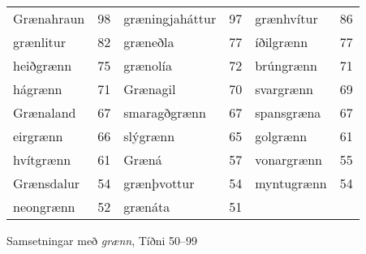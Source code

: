 \documentclass[../samsetningasafn.tex]{subfiles}
\begin{document}
\begin{wordlist}[H]
\begin{tcolorbox}

	\setlength{\extrarowheight}{3pt}
	\begin{tabular}{BlBlBl}		
		Grænahraun		& 98		& 
		græningjaháttur	& 97		& 
		grænhvítur		& 86		\\  
		grænlitur			& 82		& 	
		græneðla			& 77		& 	
		íðilgrænn			& 77		\\ 	
		heiðgrænn		& 75		& 	
		grænolía			& 72		& 	
		brúngrænn		& 71		\\ 	
		hágrænn			& 71		& 		
		Grænagil			& 70		& 	
		svargrænn		& 69		\\ 	
		Grænaland		& 67		& 	
		smaragðgrænn	& 67		& 	
		spansgræna		& 67		\\ 	
		eirgrænn			& 66		& 	
		slýgrænn			& 65		& 	
		golgrænn			& 61		\\ 
		hvítgrænn		& 61		& 
		Græná			& 57		& 		
		vonargrænn		& 55		\\ 	
		Grænsdalur		& 54		& 	
		grænþvottur		& 54		& 	
		myntugrænn		& 54		\\ 	
		neongrænn		& 52		& 
		grænáta			& 51		& 	
						&
	\end{tabular}

\end{tcolorbox}
	\caption{Samsetningar með \textit{grænn}, Tíðni 50--99}
	\label{listi:graent.50}
\end{wordlist}
\end{document}
